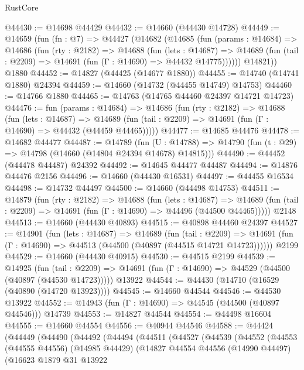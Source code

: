\begin{lexlean}{RustCore}
\begin{coremodule}
@44430 := @14698 @44429
@44432 := @14660 (@44430 @14728)
@44449 := @14659
    (fun (fn : @7) =>
    @44427
      (@14682
        (@14685
          (fun (params : @14684) =>
          @14686
            (fun (rty : @2182) =>
            @14688
              (fun (lets : @14687) =>
              @14689 (fun (tail : @2209) => @14691 (fun (Γ : @14690) => @44432 @14775))))))
        @14821))
    @1880
@44452 := @14827 (@44425 (@14677 @1880))
@44455 := @14740 (@14741 @1880) @24394
@44459 := @14660 (@14732 (@44455 @14749) @14753)
@44460 := @14766 @1880
@44465 := @14763 (@14765 @44460 @24397 @14721 @14723)
@44476 := fun (params : @14684) =>
  @14686
    (fun (rty : @2182) =>
    @14688
      (fun (lets : @14687) =>
      @14689 (fun (tail : @2209) => @14691 (fun (Γ : @14690) => @44432 (@44459 @44465)))))
@44477 := @14685 @44476
@44478 := @14682 @44477
@44487 := @14789
    (fun (U : @14788) => @14790 (fun (t : @29) => @14798 (@14660 (@14804 @24394 @14678) @14815)))
@44490 := @44452 (@44478 @44487) @24392
@44492 := @14645 @44477 @44487
@44494 := @14876 @44476 @2156
@44496 := @14660 (@44430 @16531)
@44497 := @44455 @16534
@44498 := @14732 @44497
@44500 := @14660 (@44498 @14753)
@44511 := @14879
    (fun (rty : @2182) =>
    @14688
      (fun (lets : @14687) =>
      @14689 (fun (tail : @2209) => @14691 (fun (Γ : @14690) => @44496 (@44500 @44465)))))
    @2148
@44513 := @14660 (@44430 @40893)
@44515 := @40898 @44460 @24397
@44527 := @14901
    (fun (lets : @14687) =>
    @14689
      (fun (tail : @2209) =>
      @14691 (fun (Γ : @14690) => @44513 (@44500 (@40897 (@44515 @14721 @14723))))))
    @2199
@44529 := @14660 (@44430 @40915)
@44530 := @44515 @2199
@44539 := @14925
    (fun (tail : @2209) => @14691 (fun (Γ : @14690) => @44529 (@44500 (@40897 (@44530 @14723)))))
    @13922
@44544 := @44430 (@14710 (@16529 (@40890 (@14720 @13923))))
@44545 := @14660 @44544
@44546 := @44530 @13922
@44552 := @14943 (fun (Γ : @14690) => @44545 (@44500 (@40897 @44546))) @14739
@44553 := @14827 @44544
@44554 := @44498 @16604
@44555 := @14660 @44554
@44556 := @40944 @44546
@44588 := @44424
    (@44449
      (@44490
        (@44492
          (@44494
            (@44511
              (@44527
                (@44539
                  (@44552
                    (@44553
                      (@44555 @44556)
                      (@14985 @44429)
                      (@14827
                        @44554
                        @44556
                        (@14990 @44497)
                        (@16623
                          @1879
                          @31
                          @13922

\end{coremodule}
\end{lexlean}

